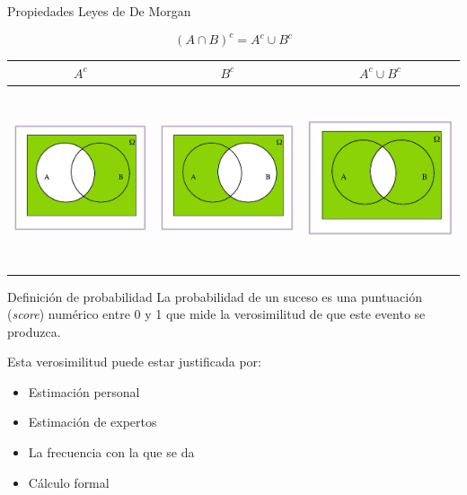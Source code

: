 \documentclass[
  ignorenonframetext,
]{beamer}
\begin{document}
\begin{frame}{Propiedades}
\protect\hypertarget{propiedades-7}{}
Leyes de De Morgan

\[(A\cap B)^c=A^c\cup B^c\]

\begin{longtable}[]{@{}ccc@{}}
\toprule
\(A^c\) & \(B^c\) & \(A^c\cup B^c\) \\
\midrule
\endhead
\includegraphics[width=\textwidth,height=2.08333in]{Images/proba1dibujos/demorgan3.jpg}
&
\includegraphics[width=\textwidth,height=2.08333in]{Images/proba1dibujos/demorgan5.jpg}
&
\includegraphics[width=\textwidth,height=2.08333in]{Images/proba1dibujos/demorgan4.jpg} \\
\bottomrule
\end{longtable}
\end{frame}

\begin{frame}{Definición de probabilidad}
\protect\hypertarget{definiciuxf3n-de-probabilidad}{}
La probabilidad de un suceso es una puntuación (\emph{score}) numérico
entre 0 y 1 que mide la verosimilitud de que este evento se produzca.

Esta verosimilitud puede estar justificada por:

\begin{itemize}
\item
  Estimación personal
\item
  Estimación de expertos
\item
  La frecuencia con la que se da
\item
  Cálculo formal
\end{itemize}
\end{frame}
\end{document}
